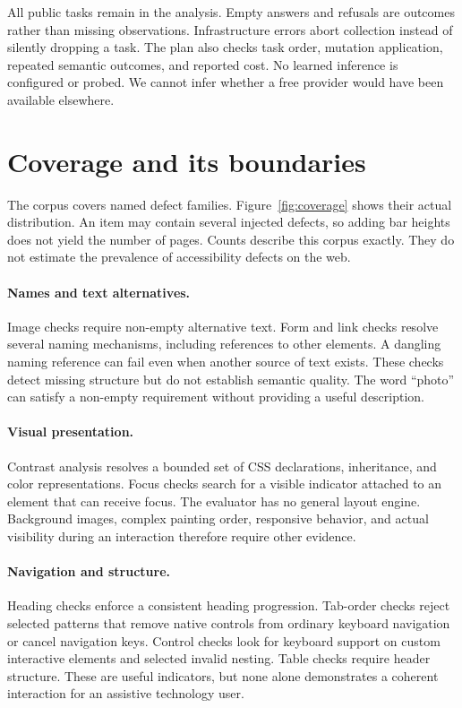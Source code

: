 \documentclass{article}
\begin{document}
All public tasks remain in the analysis. Empty answers and refusals are outcomes rather than missing observations. Infrastructure errors abort collection instead of silently dropping a task. The plan also checks task order, mutation application, repeated semantic outcomes, and reported cost. No learned inference is configured or probed. We cannot infer whether a free provider would have been available elsewhere.


\section{Coverage and its boundaries}
The corpus covers \CheckCount{} named defect families. Figure~\ref{fig:coverage} shows their actual distribution. An item may contain several injected defects, so adding bar heights does not yield the number of pages. Counts describe this corpus exactly. They do not estimate the prevalence of accessibility defects on the web.


\paragraph{Names and text alternatives.} Image checks require non-empty alternative text. Form and link checks resolve several naming mechanisms, including references to other elements. A dangling naming reference can fail even when another source of text exists. These checks detect missing structure but do not establish semantic quality. The word ``photo'' can satisfy a non-empty requirement without providing a useful description.
\paragraph{Visual presentation.} Contrast analysis resolves a bounded set of CSS declarations, inheritance, and color representations. Focus checks search for a visible indicator attached to an element that can receive focus. The evaluator has no general layout engine. Background images, complex painting order, responsive behavior, and actual visibility during an interaction therefore require other evidence.
\paragraph{Navigation and structure.} Heading checks enforce a consistent heading progression. Tab-order checks reject selected patterns that remove native controls from ordinary keyboard navigation or cancel navigation keys. Control checks look for keyboard support on custom interactive elements and selected invalid nesting. Table checks require header structure. These are useful indicators, but none alone demonstrates a coherent interaction for an assistive technology user.
\end{document}
